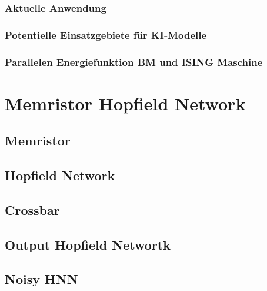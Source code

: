 \subsubsection{Aktuelle Anwendung}
\subsubsection{Potentielle Einsatzgebiete für KI-Modelle}
\subsubsection{Parallelen Energiefunktion BM und ISING Maschine}

\section{Memristor Hopfield Network}
\subsection{Memristor}
\subsection{Hopfield Network}
\subsection{Crossbar}
\subsection{Output Hopfield Networtk}
\subsection{Noisy HNN}

